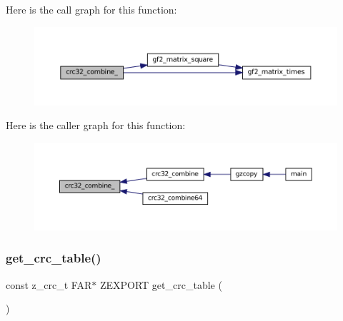 Here is the call graph for this function\+:
\nopagebreak
\begin{figure}[H]
\begin{center}
\leavevmode
\includegraphics[width=350pt]{third-party_2zlib_2crc32_8c_a36a8eb95bf402949b5a68f7157df7ca2_cgraph}
\end{center}
\end{figure}
Here is the caller graph for this function\+:
\nopagebreak
\begin{figure}[H]
\begin{center}
\leavevmode
\includegraphics[width=350pt]{third-party_2zlib_2crc32_8c_a36a8eb95bf402949b5a68f7157df7ca2_icgraph}
\end{center}
\end{figure}
\mbox{\label{third-party_2zlib_2crc32_8c_a7d4540ffeee6cb5c74978e3040b7a69a}} 
\subsubsection{\texorpdfstring{get\+\_\+crc\+\_\+table()}{get\_crc\_table()}}
{\footnotesize\ttfamily const z\+\_\+crc\+\_\+t F\+AR$\ast$ Z\+E\+X\+P\+O\+RT get\+\_\+crc\+\_\+table (\begin{DoxyParamCaption}{ }\end{DoxyParamCaption})}

